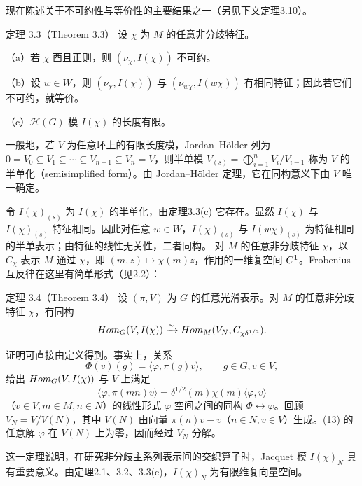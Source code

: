 现在陈述关于不可约性与等价性的主要结果之一（另见下文定理3.10）。
\begin{originaltheorem}{定理 3.3（Theorem 3.3）}
设 $\chi$ 为 $M$ 的任意非分歧特征。

（a）若 $\chi$ 酉且正则，则 $(\nu_\chi,I(\chi))$ 不可约。

（b）设 $w\in W$，则 $(\nu_\chi,I(\chi))$ 与 $(\nu_{w\chi},I(w\chi))$ 有相同特征；因此若它们不可约，就等价。

（c）$\mathcal H(G)$ 模 $I(\chi)$ 的长度有限。
\end{originaltheorem}
一般地，若 $V$ 为任意环上的有限长度模，Jordan--Hölder 列为 $0=V_0\subseteq V_1\subseteq\cdots\subseteq V_{n-1}\subseteq V_n=V$，则半单模 $V_{(s)}=\bigoplus_{i=1}^nV_i/V_{i-1}$ 称为 $V$ 的半单化（semisimplified form）。由 Jordan--Hölder 定理，它在同构意义下由 $V$ 唯一确定。

令 $I(\chi)_{(s)}$ 为 $I(\chi)$ 的半单化，由定理3.3(c) 它存在。显然 $I(\chi)$ 与 $I(\chi)_{(s)}$ 特征相同。因此对任意 $w\in W$，$I(\chi)_{(s)}$ 与 $I(w\chi)_{(s)}$ 为特征相同的半单表示；由特征的线性无关性，二者同构。
对 $M$ 的任意非分歧特征 $\chi$，以 $C_\chi$ 表示 $M$ 通过 $\chi$，即 $(m,z)\mapsto\chi(m)z$，作用的一维复空间 $C^1$。Frobenius 互反律在这里有简单形式（见2.2）：
\begin{originaltheorem}{定理 3.4（Theorem 3.4）}
设 $(\pi,V)$ 为 $G$ 的任意光滑表示。对 $M$ 的任意非分歧特征 $\chi$，有同构
\[
Hom_G(V,I(\chi))\xrightarrow{\sim}Hom_M(V_N,C_{\chi\delta^{1/2}}).
\]
\end{originaltheorem}
证明可直接由定义得到。事实上，关系
\[
\Phi(v)(g)=\langle\varphi,\pi(g)v\rangle,\qquad g\in G,v\in V,\tag{12}
\]
给出 $Hom_G(V,I(\chi))$ 与 $V$ 上满足
\[
\langle\varphi,\pi(mn)v\rangle=\delta^{1/2}(m)\chi(m)\langle\varphi,v\rangle\tag{13}
\]
（$v\in V,m\in M,n\in N$）的线性形式 $\varphi$ 空间之间的同构 $\Phi\leftrightarrow\varphi$。回顾 $V_N=V/V(N)$，其中 $V(N)$ 由向量 $\pi(n)v-v$（$n\in N,v\in V$）生成。(13) 的任意解 $\varphi$ 在 $V(N)$ 上为零，因而经过 $V_N$ 分解。

这一定理说明，在研究非分歧主系列表示间的交织算子时，Jacquet 模 $I(\chi)_N$ 具有重要意义。由定理2.1、3.2、3.3(c)，$I(\chi)_N$ 为有限维复向量空间。

